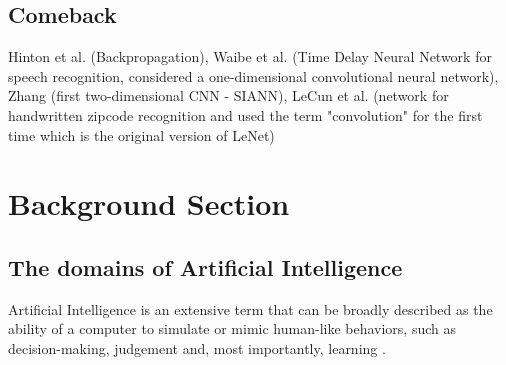 \documentclass[12pt]{article}
\begin{document}


\subsection{Comeback}
Hinton et al. (Backpropagation), Waibe et al. (Time Delay Neural Network for speech recognition, considered a one-dimensional convolutional neural network), Zhang (first two-dimensional CNN - SIANN), LeCun et al. (network for handwritten zipcode recognition and used the term "convolution" for the first time which is the original version of LeNet)




\section{Background Section}



\subsection{The domains of Artificial Intelligence}
Artificial Intelligence is an extensive term that can be broadly described as the ability of a computer to simulate or mimic human-like behaviors, such as decision-making, judgement and, most importantly, learning \autocite{zhangStudyArtificialIntelligence2021}.

\newpage
\printbibliography
\end{document}
